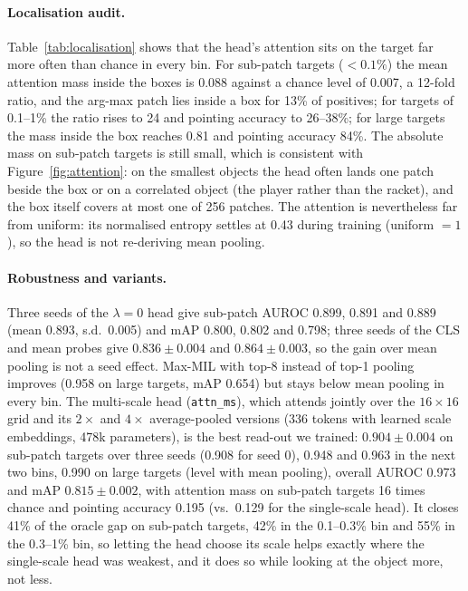 \documentclass[10pt,letterpaper,twocolumn]{article}
\begin{document}
\paragraph{Localisation audit.}
Table~\ref{tab:localisation} shows that the head's attention sits on the target far more often
than chance in every bin. For sub-patch targets ($<0.1\%$) the mean attention mass inside the
boxes is 0.088 against a chance level of 0.007, a 12-fold ratio, and the arg-max patch lies
inside a box for 13\% of positives; for targets of 0.1--1\% the ratio rises to 24 and pointing
accuracy to 26--38\%; for large targets the mass inside the box reaches 0.81 and pointing
accuracy 84\%. The absolute mass on sub-patch targets is still small, which is consistent with
Figure~\ref{fig:attention}: on the smallest objects the head often lands one patch beside the
box or on a correlated object (the player rather than the racket), and the box itself covers at
most one of 256 patches. The attention is nevertheless far from uniform: its normalised entropy
settles at 0.43 during training (uniform $=1$), so the head is not re-deriving mean pooling.

\paragraph{Robustness and variants.}
Three seeds of the $\lambda=0$ head give sub-patch AUROC 0.899, 0.891 and 0.889 (mean 0.893, s.d.\ 0.005) and mAP 0.800, 0.802 and 0.798; three seeds of the CLS and mean probes give $0.836\pm0.004$ and $0.864\pm0.003$, so the gain over mean pooling is not a seed effect. Max-MIL with top-8 instead of top-1 pooling improves (0.958 on large targets, mAP 0.654) but stays below mean pooling in every bin. The multi-scale head
(\texttt{attn\_ms}), which attends jointly over the $16\times16$ grid and its $2\times$ and
$4\times$ average-pooled versions (336 tokens with learned scale embeddings, 478k parameters),
is the best read-out we trained: $0.904\pm0.004$ on sub-patch targets over three seeds (0.908 for seed 0), 0.948 and 0.963 in the next two bins, 0.990 on large targets (level with mean pooling), overall AUROC 0.973 and mAP $0.815\pm0.002$, with
attention mass on sub-patch targets 16 times chance and pointing accuracy 0.195 (vs.\ 0.129
for the single-scale head). It closes 41\% of the oracle gap on sub-patch targets, 42\% in the
0.1--0.3\% bin and 55\% in the 0.3--1\% bin, so letting the head choose its scale helps exactly
where the single-scale head was weakest, and it does so while looking at the object more, not
less.
\end{document}
